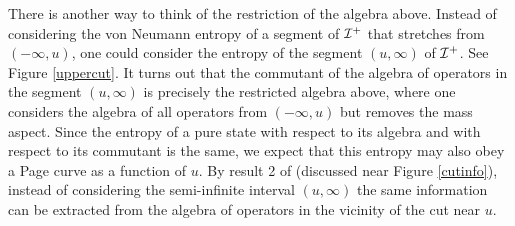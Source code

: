 \documentclass[12pt]{article}
\def \scrip{{\cal I}^{+}}
\begin{document}
There is another way to think of the restriction of the algebra above. Instead of considering the von Neumann entropy of a segment of $\scrip$ that stretches from $(-\infty, u)$, one could consider the entropy of the segment $(u, \infty)$ of $\scrip$. See Figure \ref{uppercut}. It turns out that the commutant of the algebra of operators in the segment $(u, \infty)$ is precisely the restricted algebra above, where one considers the algebra of all operators from $(-\infty, u)$ but removes the mass aspect. Since the entropy of a pure state with respect to its algebra and with respect to its commutant is the same, we expect that this entropy may also obey a Page curve as a function of $u$. By result 2 of \cite{Laddha:2020kvp} (discussed near Figure \ref{cutinfo}), instead of considering the semi-infinite interval $(u, \infty)$  the same information can be extracted from the algebra of operators in the vicinity of the cut near $u$.
\end{document}
